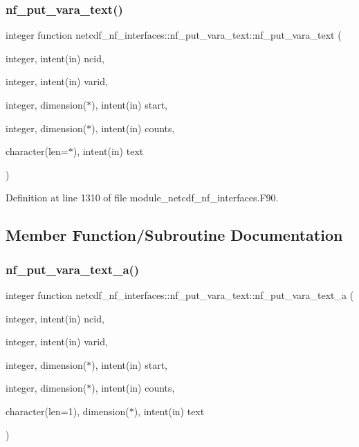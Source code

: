 \subsubsection{\texorpdfstring{nf\+\_\+put\+\_\+vara\+\_\+text()}{nf\_put\_vara\_text()}}
{\footnotesize\ttfamily integer function netcdf\+\_\+nf\+\_\+interfaces\+::nf\+\_\+put\+\_\+vara\+\_\+text\+::nf\+\_\+put\+\_\+vara\+\_\+text (\begin{DoxyParamCaption}\item[{integer, intent(in)}]{ncid,  }\item[{integer, intent(in)}]{varid,  }\item[{integer, dimension($\ast$), intent(in)}]{start,  }\item[{integer, dimension($\ast$), intent(in)}]{counts,  }\item[{character(len=$\ast$), intent(in)}]{text }\end{DoxyParamCaption})}



Definition at line 1310 of file module\+\_\+netcdf\+\_\+nf\+\_\+interfaces.\+F90.



\subsection{Member Function/\+Subroutine Documentation}
\mbox{\label{interfacenetcdf__nf__interfaces_1_1nf__put__vara__text_a85f011ce2c04d85ee3fc94dbdabc77d7}} 
\subsubsection{\texorpdfstring{nf\+\_\+put\+\_\+vara\+\_\+text\+\_\+a()}{nf\_put\_vara\_text\_a()}}
{\footnotesize\ttfamily integer function netcdf\+\_\+nf\+\_\+interfaces\+::nf\+\_\+put\+\_\+vara\+\_\+text\+::nf\+\_\+put\+\_\+vara\+\_\+text\+\_\+a (\begin{DoxyParamCaption}\item[{integer, intent(in)}]{ncid,  }\item[{integer, intent(in)}]{varid,  }\item[{integer, dimension($\ast$), intent(in)}]{start,  }\item[{integer, dimension($\ast$), intent(in)}]{counts,  }\item[{character(len=1), dimension($\ast$), intent(in)}]{text }\end{DoxyParamCaption})}



